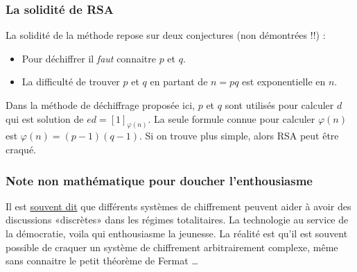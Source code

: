 \subsubsection{La solidité de RSA}

La solidité de la méthode repose sur deux conjectures (non démontrées !!) :
\begin{itemize}
    \item Pour déchiffrer il \emph{faut} connaitre \( p\) et \( q\). 
    \item La difficulté de trouver \( p\) et \( q\) en partant de \( n=pq\) est exponentielle en \( n\).
\end{itemize}
Dans la méthode de déchiffrage proposée ici, \( p\) et \( q\) sont utilisés pour calculer \( d\) qui est solution de \( ed=[1]_{\varphi(n)}\). La seule formule connue pour calculer \( \varphi(n)\) est \( \varphi(n)=(p-1)(q-1)\). Si on trouve plus simple, alors RSA peut être craqué.

\subsubsection{Note non mathématique pour doucher l'enthousiasme}

Il est \href{https://www.torproject.org/about/torusers.html.en#activists}{souvent dit} que différents systèmes de chiffrement peuvent aider à avoir des discussions «discrètes» dans les régimes totalitaires. La technologie au service de la démocratie, voila qui enthousiasme la jeunesse. La réalité est qu'il est souvent possible de craquer un système de chiffrement arbitrairement complexe, même sans connaitre le petit théorème de Fermat \ldots

